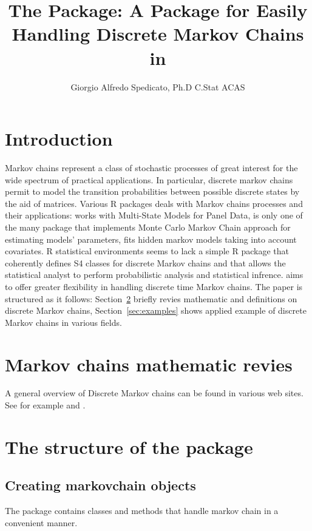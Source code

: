 \documentclass[nojss]{jss}
\author{Giorgio Alfredo Spedicato, Ph.D C.Stat ACAS}
\title{The \pkg{markovchain} Package: A Package for Easily Handling Discrete
Markov Chains in \proglang{R}}
\begin{document}
\maketitle

\section{Introduction}

Markov chains represent a class of stochastic processes of great interest for the wide spectrum of practical applications. %
In particular, discrete markov chains permit to model the transition probabilities between possible discrete states by the aid of matrices.
Various R packages deals with Markov chains processes and their applications:  \citep{msmR} works with Multi-State Models for Panel Data,  \citep{mcmcR} is only one of the many package that implements Monte Carlo Markov Chain approach for estimating models' parameters,  fits hidden markov models taking into account covariates. R statistical environments seems to lack a simple R package that coherently defines S4 classes for discrete Markov chains and that allows the statistical analyst to perform probabilistic analysis and statistical infrence.   \citep{markovchainR} aims to offer greater flexibility in handling discrete time Markov chains. The paper is structured as it follows: Section~\ref{sec:mathematic} briefly revies mathematic and definitions on discrete Markov chains, Section~\ref{sec:examples} shows applied example of discrete Markov chains in various fields.


\section{Markov chains mathematic revies}\label{sec:mathematic}

A general overview of Discrete Markov chains can be found in various web sites. See for example \cite{wiki:markov} and \cite{chapter11}.


\section{The structure of the package}\label{sec:structure}
\subsection{Creating markovchain objects}

The package  contains classes and methods that handle 
markov chain in a convenient manner.\\
\end{document}
